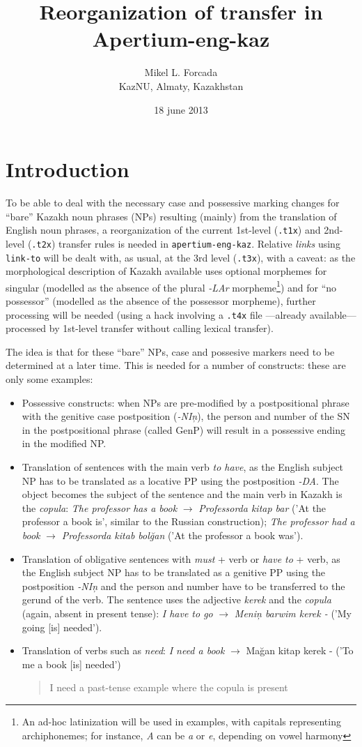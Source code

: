 \documentclass{article}
\title{Reorganization of transfer in Apertium-eng-kaz}
\author{Mikel L. Forcada \\ KazNU, Almaty, Kazakhstan}
\date{18 june 2013}
\newcommand{\com}[1]{\begin{quote}\begin{sf}#1\end{sf}\end{quote}}
\begin{document}
\maketitle

\section{Introduction}
To be able to deal with the necessary case and possessive marking changes for ``bare'' Kazakh noun phrases (NPs) resulting (mainly) from the translation of English noun phrases, a reorganization of the current 1st-level (\texttt{.t1x}) and 2nd-level (\texttt{.t2x}) transfer rules is needed in \texttt{apertium-eng-kaz}. Relative \emph{links} using \texttt{link-to} will be dealt with, as usual, at the 3rd level (\texttt{.t3x}), with a caveat: as the morphological description of Kazakh available uses optional morphemes for singular (modelled as the absence of the plural \emph{-LAr} morpheme\footnote{An ad-hoc latinization will be used in examples, with capitals representing archiphonemes; for instance, \emph{A} can be \emph{a} or \emph{e}, depending on vowel harmony}) and for ``no possessor'' (modelled as the absence of the possessor morpheme), further processing will be needed (using a hack involving a \texttt{.t4x} file ---already available--- processed by 1st-level transfer without calling lexical transfer). 

The idea is that for these ``bare'' NPs, case and possesive markers need to be determined at a later time. This is needed for a number of constructs: these are only some examples:
\begin{itemize}
\item Possessive constructs: when NPs are pre-modified by a postpositional phrase with the genitive case postposition (\emph{-NI\c{n}}), the person and number of the SN in the postpositional phrase (called \(\mathrm{GenP}\)) will result in a possessive ending in the modified NP.
\item Translation of sentences with the main verb \emph{to have}, as the English subject NP has to be translated as a locative PP using the postposition \emph{-DA}. The object becomes the subject of the sentence and the main verb in Kazakh is the \emph{copula}:
\emph{The professor has a book} \(\to\) \emph{Professorda kitap bar} ('At the professor a book is',  similar to the Russian construction); \emph{The professor had a book} \(\to\) \emph{Professorda kitab bol\u{g}an} ('At the professor a book was').
\item Translation of obligative sentences with \emph{must} + verb or \emph{have to} + verb, as the English subject NP has to be translated as a genitive PP using the postposition \emph{-NI\c{n}} and the person and  number have to be transferred to the gerund of the verb. The sentence uses the adjective \emph{kerek} and the \emph{copula} (again, absent in present tense):
\emph{I have to go} \(\to\) \emph{Meni\c{n} barwim kerek -} ('My going [is] needed').
\item Translation of verbs such as \emph{need}: \emph{I need a book} \(\to\) {Ma\u{g}an kitap kerek -} ('To me a book [is] needed')
\com{I need a past-tense example where the copula is present}
\end{itemize}
\com{[The last list may be completed]}
\end{document}
